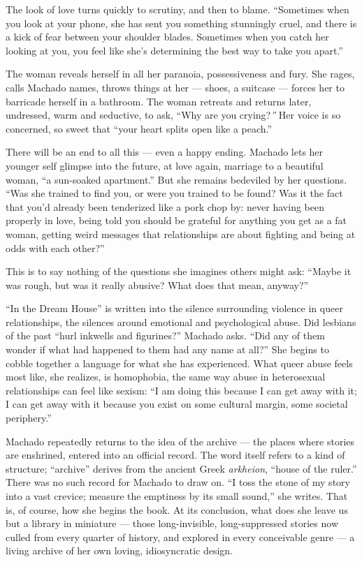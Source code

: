 The look of love turns quickly to scrutiny, and then to blame.
``Sometimes when you look at your phone, she has sent you something
stunningly cruel, and there is a kick of fear between your shoulder
blades. Sometimes when you catch her looking at you, you feel like she's
determining the best way to take you apart.''

The woman reveals herself in all her paranoia, possessiveness and fury.
She rages, calls Machado names, throws things at her --- shoes, a
suitcase --- forces her to barricade herself in a bathroom. The woman
retreats and returns later, undressed, warm and seductive, to ask, ``Why
are you crying?\emph{''} Her voice is so concerned, so sweet that ``your
heart splits open like a peach.''

There will be an end to all this --- even a happy ending. Machado lets
her younger self glimpse into the future, at love again, marriage to a
beautiful woman, ``a sun-soaked apartment.'' But she remains bedeviled
by her questions. ``Was she trained to find you, or were you trained to
be found? Was it the fact that you'd already been tenderized like a pork
chop by: never having been properly in love, being told you should be
grateful for anything you get as a fat woman, getting weird messages
that relationships are about fighting and being at odds with each
other?''

This is to say nothing of the questions she imagines others might ask:
``Maybe it was rough, but was it really abusive? What does that mean,
anyway?''

``In the Dream House'' is written into the silence surrounding violence
in queer relationships, the silences around emotional and psychological
abuse. Did lesbians of the past ``hurl inkwells and figurines?'' Machado
asks. ``Did any of them wonder if what had happened to them had any name
at all?'' She begins to cobble together a language for what she has
experienced. What queer abuse feels most like, she realizes, is
homophobia, the same way abuse in heterosexual relationships can feel
like sexism: ``I am doing this because I can get away with it; I can get
away with it because you exist on some cultural margin, some societal
periphery.''

Machado repeatedly returns to the idea of the archive --- the places
where stories are enshrined, entered into an official record. The word
itself refers to a kind of structure; ``archive'' derives from the
ancient Greek \emph{arkheion}, ``house of the ruler.'' There was no such
record for Machado to draw on. ``I toss the stone of my story into a
vast crevice; measure the emptiness by its small sound,'' she writes.
That is, of course, how she begins the book. At its conclusion, what
does she leave us but a library in miniature --- those long-invisible,
long-suppressed stories now culled from every quarter of history, and
explored in every conceivable genre --- a living archive of her own
loving, idiosyncratic design.

